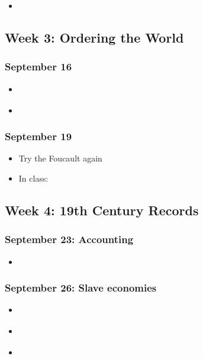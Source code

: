 \begin{itemize}
\item
  \cite{muller-wille_natural_2012}
\end{itemize}

\subsection{Week 3: Ordering the World}

\subsubsection{September 16}

\begin{itemize}
\item
  \cite{borges_analytical_1999}
\item
  \cite[Introduction and Chapter 3]{foucault_order_1994}
\end{itemize}

\subsubsection{September 19}

\begin{itemize}
\item
  Try the Foucault again
\item
  In class: \cite{playfair_commercial_2005}
\end{itemize}

\subsection{Week 4: 19th Century Records}

\subsubsection{September 23: Accounting}

\begin{itemize}
\item
  \cite{edwards_early_1960}
\end{itemize}

\subsubsection{September 26: Slave economies}

\begin{itemize}
\item
  \cite{garvey_facts_2013}
\item
  \cite[pp. 192-209,233-258]{fogel_time_1989}
\item
  \cite["GW Hammond, Instructions to his Overseer"]{wilentz_major_1992}
\end{itemize}


